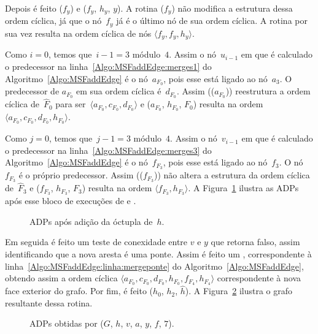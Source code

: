 Depois é feito \LCOCycle($f_y$) e \LCOMerge($f_y$, $h_y$, $y$).
A rotina \LCOCycle($f_y$) não modifica a estrutura dessa ordem cíclica, já que o nó~$f_y$ já é o último nó de sua ordem cíclica.
A rotina  por sua vez resulta na ordem cíclica de nós $\langle f_y, f_y, h_y \rangle$.

Como $i=0$, temos que~$i-1 = 3$ módulo~$4$.
Assim o nó~$u_{i-1}$ em que é calculado o predecessor na linha~\ref{Algo:MSFaddEdge:merges1} do Algoritmo~\ref{Algo:MSFaddEdge} é o nó~$a_{F_0}$, pois esse está ligado ao nó~$a_3$.
O predecessor de $a_{F_0}$ em sua ordem cíclica é~$d_{F_0}$.
Assim \LCOCycle(\treapPredecessor($a_{F_0}$)) reestrutura a ordem cíclica de~$\hat F_0$ para ser~$\langle a_{F_0}, c_{F_0}, d_{F_0}\rangle$ e \LCOMerge($a_{F_0}$, $h_{F_0}$, $F_0$) resulta na ordem $\langle a_{F_0}, c_{F_0}, d_{F_0}, h_{F_0}\rangle$.

Como $j=0$, temos que~$j-1 = 3$ módulo~$4$.
Assim o nó~$v_{i-1}$ em que é calculado o predecessor na linha~\ref{Algo:MSFaddEdge:merges3} do Algoritmo~\ref{Algo:MSFaddEdge} é o nó~$f_{F_3}$, pois esse está ligado ao nó~$f_3$.
O nó $f_{F_3}$ é o próprio predecessor.
Assim \LCOCycle(\treapPredecessor($f_{F_3}$)) não altera a estrutura da ordem cíclica de~$\hat F_3$ e \LCOMerge($f_{F_3}$, $h_{F_3}$, $F_3$) resulta na ordem $\langle  f_{F_3}, h_{F_3}\rangle$.
A Figura~\ref{fig:MSF-adiciona-ponte-2} ilustra as ADPs após esse bloco de execuções de \LCOCycle{} e \LCOMerge.

\begin{figure}[htb]
\scalebox{1}{

	}
\caption{ADPs após adição da óctupla de~$h$.}
\label{fig:MSF-adiciona-ponte-2}
\end{figure}

Em seguida é feito um teste de conexidade entre $v$ e $y$ que retorna falso, assim identificando que a nova aresta é uma ponte.
Assim é feito um , correspondente à linha~\ref{Algo:MSFaddEdge:linha:mergeponte} do Algoritmo~\ref{Algo:MSFaddEdge},
obtendo assim a ordem cíclica $\langle a_{F_0}, c_{F_0}, d_{F_0}, h_{F_0}, f_{F_4}, h_{F_4}\rangle$ correspondente à nova face exterior do grafo.
Por fim, é feito \LCOMerge($h_0$, $h_2$, $\hat h$).
A Figura~\ref{fig:MSF-adiciona-ponte-3} ilustra o grafo resultante dessa rotina.


\begin{figure}[htb]
\scalebox{1}{

}
\caption{ADPs obtidas por \MSFaddEdge($G$, $h$, $v$, $a$, $y$, $f$, $7$).}
\label{fig:MSF-adiciona-ponte-3}
\end{figure}


